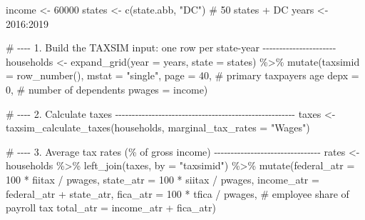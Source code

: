 \documentclass[
  letterpaper,
  DIV=11,
  numbers=noendperiod]{scrartcl}
\newenvironment{Shaded}{\begin{snugshade}}{\end{snugshade}}
\newcommand{\AttributeTok}[1]{\textcolor[rgb]{0.40,0.45,0.13}{#1}}
\newcommand{\CommentTok}[1]{\textcolor[rgb]{0.37,0.37,0.37}{#1}}
\newcommand{\DecValTok}[1]{\textcolor[rgb]{0.68,0.00,0.00}{#1}}
\newcommand{\FunctionTok}[1]{\textcolor[rgb]{0.28,0.35,0.67}{#1}}
\newcommand{\NormalTok}[1]{\textcolor[rgb]{0.00,0.23,0.31}{#1}}
\newcommand{\OtherTok}[1]{\textcolor[rgb]{0.00,0.23,0.31}{#1}}
\newcommand{\SpecialCharTok}[1]{\textcolor[rgb]{0.37,0.37,0.37}{#1}}
\newcommand{\StringTok}[1]{\textcolor[rgb]{0.13,0.47,0.30}{#1}}
\begin{document}
\begin{Shaded}
\begin{Highlighting}[]
\NormalTok{income }\OtherTok{\textless{}{-}} \DecValTok{60000}
\NormalTok{states }\OtherTok{\textless{}{-}} \FunctionTok{c}\NormalTok{(state.abb, }\StringTok{"DC"}\NormalTok{)   }\CommentTok{\# 50 states + DC}
\NormalTok{years  }\OtherTok{\textless{}{-}} \DecValTok{2016}\SpecialCharTok{:}\DecValTok{2019}

\CommentTok{\# {-}{-}{-}{-} 1. Build the TAXSIM input: one row per state{-}year {-}{-}{-}{-}{-}{-}{-}{-}{-}{-}{-}{-}{-}{-}{-}{-}{-}{-}{-}{-}{-}{-}}
\NormalTok{households }\OtherTok{\textless{}{-}} \FunctionTok{expand\_grid}\NormalTok{(}\AttributeTok{year =}\NormalTok{ years, }\AttributeTok{state =}\NormalTok{ states) }\SpecialCharTok{\%\textgreater{}\%}
  \FunctionTok{mutate}\NormalTok{(}\AttributeTok{taxsimid =} \FunctionTok{row\_number}\NormalTok{(),}
         \AttributeTok{mstat    =} \StringTok{"single"}\NormalTok{,}
         \AttributeTok{page     =} \DecValTok{40}\NormalTok{,       }\CommentTok{\# primary taxpayer\textquotesingle{}s age}
         \AttributeTok{depx     =} \DecValTok{0}\NormalTok{,        }\CommentTok{\# number of dependents}
         \AttributeTok{pwages   =}\NormalTok{ income)}

\CommentTok{\# {-}{-}{-}{-} 2. Calculate taxes {-}{-}{-}{-}{-}{-}{-}{-}{-}{-}{-}{-}{-}{-}{-}{-}{-}{-}{-}{-}{-}{-}{-}{-}{-}{-}{-}{-}{-}{-}{-}{-}{-}{-}{-}{-}{-}{-}{-}{-}{-}{-}{-}{-}{-}{-}{-}{-}{-}{-}{-}{-}{-}{-}}
\NormalTok{taxes }\OtherTok{\textless{}{-}} \FunctionTok{taxsim\_calculate\_taxes}\NormalTok{(households,}
                                \AttributeTok{marginal\_tax\_rates =} \StringTok{"Wages"}\NormalTok{)}

\CommentTok{\# {-}{-}{-}{-} 3. Average tax rates (\% of gross income) {-}{-}{-}{-}{-}{-}{-}{-}{-}{-}{-}{-}{-}{-}{-}{-}{-}{-}{-}{-}{-}{-}{-}{-}{-}{-}{-}{-}{-}{-}{-}{-}}
\NormalTok{rates }\OtherTok{\textless{}{-}}\NormalTok{ households }\SpecialCharTok{\%\textgreater{}\%}
  \FunctionTok{left\_join}\NormalTok{(taxes, }\AttributeTok{by =} \StringTok{"taxsimid"}\NormalTok{) }\SpecialCharTok{\%\textgreater{}\%}
  \FunctionTok{mutate}\NormalTok{(}\AttributeTok{federal\_atr =} \DecValTok{100} \SpecialCharTok{*}\NormalTok{ fiitax }\SpecialCharTok{/}\NormalTok{ pwages,}
         \AttributeTok{state\_atr   =} \DecValTok{100} \SpecialCharTok{*}\NormalTok{ siitax }\SpecialCharTok{/}\NormalTok{ pwages,}
         \AttributeTok{income\_atr  =}\NormalTok{ federal\_atr }\SpecialCharTok{+}\NormalTok{ state\_atr,}
         \AttributeTok{fica\_atr    =} \DecValTok{100} \SpecialCharTok{*}\NormalTok{ tfica }\SpecialCharTok{/}\NormalTok{ pwages,   }\CommentTok{\# employee share of payroll tax}
         \AttributeTok{total\_atr   =}\NormalTok{ income\_atr }\SpecialCharTok{+}\NormalTok{ fica\_atr)}


\end{Highlighting}
\end{Shaded}
\end{document}
